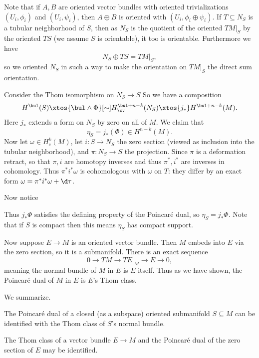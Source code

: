 Note that if $A,B$ are oriented vector bundles with oriented trivializations $(U_i,\phi_i)$ and $(U_i,\psi_i)$, then $A\oplus B$ is oriented with $(U_i,\phi_i\oplus\psi_i)$.
If $T\subseteq N_S$ is a tubular neighborhood of $S$, then as $N_S$ is the quotient of the oriented $TM|_S$ by the oriented $TS$ (we assume $S$ is orientable), it too is orientable.
Furthermore we have
$$ N_S\oplus TS = TM|_S , $$
so we oriented $N_S$ in such a way to make the orientation on $TM|_S$ the direct sum orientation.

Consider the Thom isomorphism on $N_S\to S$
So we have a composition
$$ H^\bul(S) \xtos{\bul\wedge\Phi}[\sim] H^{\bul+n-k}_\cv(N_S) \xtos{j_*} H^{\bul+n-k}(M) . $$
Here $j_*$ extends a form on $N_S$ by zero on all of $M$.
We claim that
$$ \eta_S = j_*(\Phi) \in H^{n-k}(M) . $$
Now let $\omega\in H^k_c(M)$, let $i\colon S\to N_S$ the zero section (viewed as inclusion into the tubular neighborhood), and $\pi\colon N_S\to S$ the projection.
Since $\pi$ is a deformation retract, so that $\pi,i$ are homotopy inverses and thus $\pi^*,i^*$ are inverses in cohomology.
Thus $\pi^*i^*\omega$ is cohomologous with $\omega$ on $T$: they differ by an exact form $\omega=\pi^*i^*\omega+\d\tau$.

Now notice

\medskip
\centerline{\jot\vbox{}}
\medskip

Thus $j_*\Phi$ satisfies the defining property of the Poincar\'e dual, so $\eta_S=j_*\Phi$.
Note that if $S$ is compact then this means $\eta_S$ has compact support.

Now suppose $E\to M$ is an oriented vector bundle.
Then $M$ embeds into $E$ via the zero section, so it is a submanifold.
There is an exact sequence
$$ 0 \to TM \to TE|_M \to E \to 0 , $$
meaning the normal bundle of $M$ in $E$ is $E$ itself.
Thus as we have shown, the Poincar\'e dual of $M$ in $E$ is $E$'s Thom class.

We summarize.

\bprop

    \benum
        \item The Poincar\'e dual of a closed (as a subspace) oriented submanifold $S\subseteq M$ can be identified with the Thom class of $S$'s normal bundle.
        \item The Thom class of a vector bundle $E\to M$ and the Poincar\'e dual of the zero section of $E$ may be identified.
    \eenum

